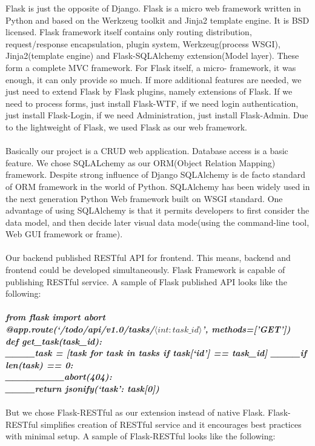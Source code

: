 \documentclass[12pt,oneside,a4paper]{article}
\begin{document}
Flask is just the opposite of Django. Flask is a micro web framework written in Python and based on the Werkzeug toolkit and Jinja2 template engine. It is BSD licensed. Flask framework itself contains only routing distribution, request/response encapsulation, plugin system, Werkzeug(process WSGI), Jinja2(template engine) and Flask-SQLAlchemy extension(Model layer). These form a complete MVC framework. For Flask itself, a micro- framework, it was enough, it can only provide so much. If more additional features are needed, we just need to extend Flask by Flask plugins, namely extensions of Flask. If we need to process forms, just install Flask-WTF, if we need login authentication, just install Flask-Login, if we need Administration, just install Flask-Admin. Due to the lightweight of Flask, we used Flask as our web framework.\\\\
Basically our project is a CRUD web application. Database access is a basic feature. We chose SQLALchemy as our ORM(Object Relation Mapping) framework. Despite strong influence of Django SQLAlchemy is de facto standard of ORM framework in the world of Python. SQLAlchemy has been widely used in the next generation Python Web framework built on WSGI standard. One advantage of using SQLAlchemy is that it permits developers to first consider the data model, and then decide later visual data mode(using the command-line tool, Web GUI framework or frame).\\\\
Our backend published RESTful API for frontend. This means, backend and frontend could be developed simultaneously. Flask Framework is capable of publishing RESTful service. A sample of Flask published API looks like the following:\\\\
\scriptsize{\textbf{\emph{from flask import abort\\
@app.route(`/todo/api/v1.0/tasks/$\langle int:task\_id\rangle$', methods=['GET'])\\
def get\_task(task\_id):\\
\_\_\_\_task = [task for task in tasks if task[`id'] == task\_id]
\_\_\_\_if len(task) == 0:\\
\_\_\_\_\_\_\_\_abort(404):\\
\_\_\_\_return jsonify({`task': task[0]})}}}\\\\
\normalsize{But we chose Flask-RESTful as our extension instead of native Flask. Flask-RESTful simplifies creation of RESTful service and it encourages best practices with minimal setup. A sample of Flask-RESTful looks like the following:\\\\}
\end{document}
